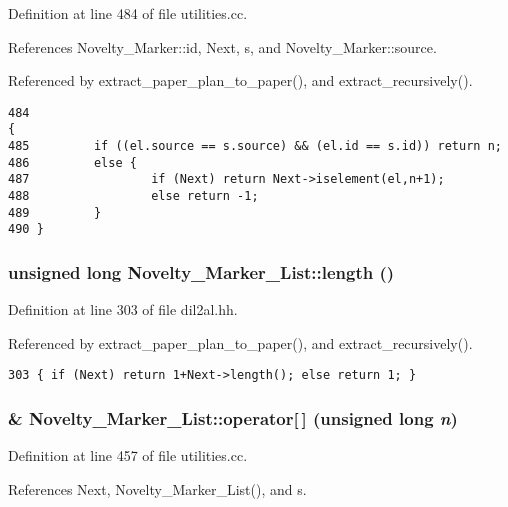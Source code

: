 Definition at line 484 of file utilities.cc.

References Novelty\_\-Marker::id, Next, s, and Novelty\_\-Marker::source.

Referenced by extract\_\-paper\_\-plan\_\-to\_\-paper(), and extract\_\-recursively().



\footnotesize\begin{verbatim}484                                                                             {
485         if ((el.source == s.source) && (el.id == s.id)) return n;
486         else {
487                 if (Next) return Next->iselement(el,n+1);
488                 else return -1;
489         }
490 }
\end{verbatim}\normalsize 
{}
\subsubsection{\setlength{\rightskip}{0pt plus 5cm}unsigned long Novelty\_\-Marker\_\-List::length ()\hspace{0.3cm}{\tt  [inline]}}\label{classNovelty__Marker__List_a8}




Definition at line 303 of file dil2al.hh.

Referenced by extract\_\-paper\_\-plan\_\-to\_\-paper(), and extract\_\-recursively().



\footnotesize\begin{verbatim}303 { if (Next) return 1+Next->length(); else return 1; }
\end{verbatim}\normalsize 
{}
\subsubsection{ \& Novelty\_\-Marker\_\-List::operator[$\,$] (unsigned long {\em n})}\label{classNovelty__Marker__List_a4}




Definition at line 457 of file utilities.cc.

References Next, Novelty\_\-Marker\_\-List(), and s.



